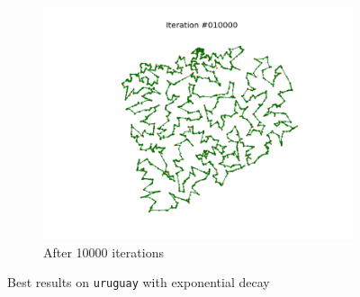 \documentclass[11pt]{article}
\begin{document}
\begin{figure}
\begin{subfigure}{.33\textwidth}
  \includegraphics[trim={4cm 2cm 4cm 2cm}, clip=true,width=\linewidth]{u_10000.png}
  \caption{After 10000 iterations}
\end{subfigure}
\caption{Best results on \texttt{uruguay} with exponential decay}
\label{fig:buruguay}

\end{figure}
\end{document}
